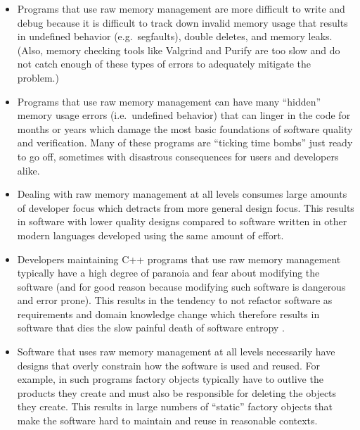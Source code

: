 \documentclass[pdf,ps2pdf,11pt]{SANDreport}
\begin{document}
\begin{itemize}

{}\item Programs that use raw memory management are more difficult to
write and debug because it is difficult to track down invalid memory
usage that results in undefined behavior (e.g.\ segfaults), double
deletes, and memory leaks.  (Also, memory checking tools like Valgrind
and Purify are too slow and do not catch enough of these types of
errors to adequately mitigate the problem.)

{}\item Programs that use raw memory management can have many
``hidden'' memory usage errors (i.e.\ undefined behavior) that can
linger in the code for months or years which damage the most basic
foundations of software quality and verification.  Many of these
programs are ``ticking time bombs'' just ready to go off, sometimes
with disastrous consequences for users and developers alike.

{}\item Dealing with raw memory management at all levels consumes large
amounts of developer focus which detracts from more general design
focus.  This results in software with lower quality designs compared
to software written in other modern languages developed using the same
amount of effort.

{}\item Developers maintaining C++ programs that use raw memory
management typically have a high degree of paranoia and fear about
modifying the software (and for good reason because modifying such
software is dangerous and error prone).  This results in the tendency
to not refactor software as requirements and domain knowledge change
{}\cite{DomainDrivenDesign} which therefore results in software that
dies the slow painful death of software entropy
{}\cite{MythicalManMonth95}.

{}\item Software that uses raw memory management at all levels
necessarily have designs that overly constrain how the software is
used and reused.  For example, in such programs factory objects
typically have to outlive the products they create and must also be
responsible for deleting the objects they create.  This results in
large numbers of ``static'' factory objects that make the software
hard to maintain and reuse in reasonable contexts.

\end{itemize}
\end{document}
